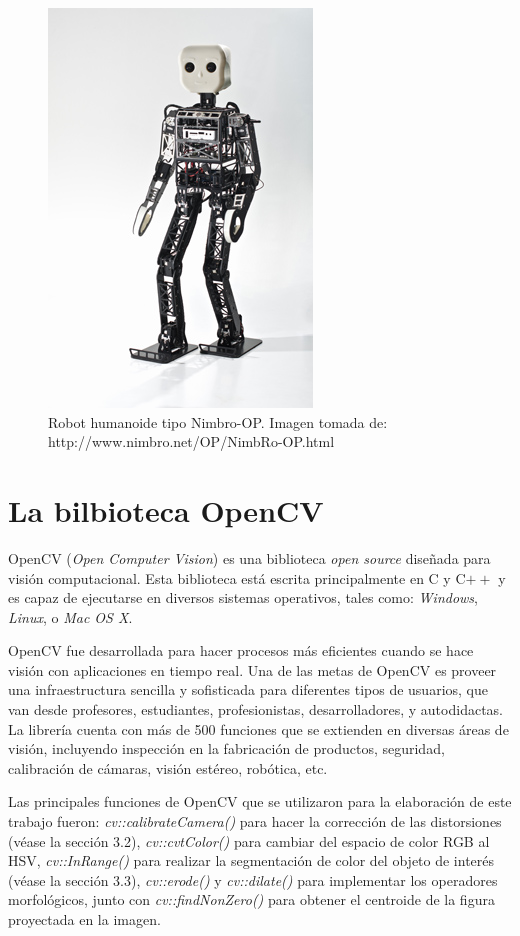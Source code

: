 \begin{figure}
\centering
\includegraphics[scale=2.0]{images/Nimbro-OP.jpg}
\caption{Robot humanoide tipo Nimbro-OP. Imagen tomada de: http://www.nimbro.net/OP/NimbRo-OP.html}
\label{fig:Nimbro-OP}
\end{figure} 
	
	\section{La bilbioteca OpenCV}
OpenCV (\textit{Open Computer Vision}) es una biblioteca \textit{open source} diseñada para visión computacional. Esta biblioteca está escrita principalmente en C y C$++$ y es capaz de ejecutarse en diversos sistemas operativos, tales como: \textit{Windows}, \textit{Linux}, o \textit{Mac OS X}.

OpenCV fue desarrollada para hacer procesos más eficientes cuando se hace visión con aplicaciones en tiempo real. Una de las metas de OpenCV es proveer una infraestructura sencilla y sofisticada para  diferentes tipos de usuarios, que van desde profesores, estudiantes, profesionistas, desarrolladores, y autodidactas. La librería cuenta con más de 500 funciones que se extienden en diversas áreas de visión, incluyendo inspección en la fabricación de productos, seguridad, calibración de cámaras, visión estéreo, robótica, etc.

	Las principales funciones de OpenCV que se utilizaron para la elaboración de este trabajo fueron:  \textit{cv::calibrateCamera()} para hacer la corrección de las distorsiones (véase la sección 3.2), \textit{cv::cvtColor()} para cambiar del espacio de color RGB al HSV, \textit{cv::InRange()} para realizar la segmentación de color del objeto de interés (véase la sección 3.3), \textit{cv::erode()} y \textit{cv::dilate()} para implementar los operadores morfológicos, junto con \textit{cv::findNonZero()} para obtener el centroide de la figura proyectada en la imagen. 
	
